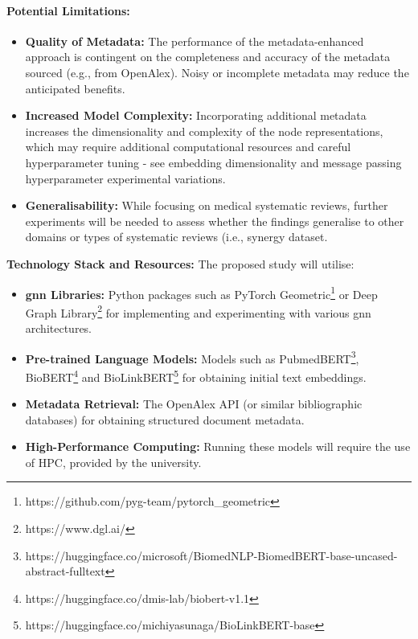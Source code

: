 \documentclass[10pt,oneside]{book}
\begin{document}
\paragraph{Potential Limitations:}
\begin{itemize} 

\item \textbf{Quality of Metadata:} The performance of the metadata-enhanced approach is contingent on the completeness and accuracy of the metadata sourced (e.g., from OpenAlex). Noisy or incomplete metadata may reduce the anticipated benefits. 

\item \textbf{Increased Model Complexity:} Incorporating additional metadata increases the dimensionality and complexity of the node representations, which may require additional computational resources and careful hyperparameter tuning - see embedding dimensionality and message passing hyperparameter experimental variations. 
\item \textbf{Generalisability:} While focusing on medical systematic reviews, further experiments will be needed to assess whether the findings generalise to other domains or types of systematic reviews (i.e., synergy dataset. 

\end{itemize}

\textbf{Technology Stack and Resources:}
The proposed study will utilise: \begin{itemize} \item \textbf{\gls*{gnn} Libraries:} Python packages such as PyTorch Geometric\footnote{https://github.com/pyg-team/pytorch\_geometric} or Deep Graph Library\footnote{https://www.dgl.ai/} for implementing and experimenting with various \gls*{gnn} architectures. \item \textbf{Pre-trained Language Models:} Models such as PubmedBERT\footnote{https://huggingface.co/microsoft/BiomedNLP-BiomedBERT-base-uncased-abstract-fulltext}, BioBERT\footnote{https://huggingface.co/dmis-lab/biobert-v1.1} and BioLinkBERT\footnote{https://huggingface.co/michiyasunaga/BioLinkBERT-base} for obtaining initial text embeddings. \item \textbf{Metadata Retrieval:} The OpenAlex API (or similar bibliographic databases) for obtaining structured document metadata. 
\item \textbf{High-Performance Computing: } Running these models will require the use of HPC, provided by the university.
\end{itemize}
\end{document}
